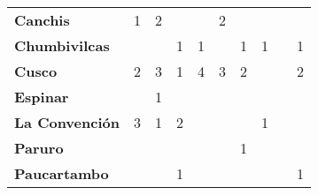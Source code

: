 \begin{tabular}{lccccccccc}
	\textbf{Canchis}                            
	&1  										&2                 			  &\cellcolor[HTML]{FCC46C}                   &\cellcolor[HTML]{FCC46C}                   &2         &\cellcolor[HTML]{FCC46C}                				  	 &\cellcolor[HTML]{FCC46C}                   &\cellcolor[HTML]{FCC46C} 		  &\cellcolor[HTML]{FCC46C} \\
	\textbf{Chumbivilcas}                      
	&\cellcolor[HTML]{FCC46C}                   &\cellcolor[HTML]{FCC46C}        &1                   &1                    						&\cellcolor[HTML]{FCC46C}                               &1                  						&1            								&\cellcolor[HTML]{FCC46C}   			    &1 \\
	\textbf{Cusco}                             
	&2 				     						&3                  			 &1                    				        &4                                          &3                    			 			&2                  
	&\cellcolor[HTML]{FCC46C}                   &\cellcolor[HTML]{FCC46C}    	 
	&2 					\\
	\textbf{Espinar}       					   
	&\cellcolor[HTML]{FCC46C}        			&1                						   
	&\cellcolor[HTML]{FCC46C}                   &\cellcolor[HTML]{FCC46C}        &\cellcolor[HTML]{FCC46C}                   &\cellcolor[HTML]{FCC46C}                   &\cellcolor[HTML]{FCC46C}  		            &\cellcolor[HTML]{FCC46C} 
	&\cellcolor[HTML]{FCC46C} \\
	\textbf{La Convención}                     
	&3 				 							&1                               &2                     					    &\cellcolor[HTML]{FCC46C}                   		&\cellcolor[HTML]{FCC46C}                   &\cellcolor[HTML]{FCC46C}                   &1              							&\cellcolor[HTML]{FCC46C} 								 &\cellcolor[HTML]{FCC46C}\\
	\textbf{Paruro}                            
	&\cellcolor[HTML]{FCC46C} 					&\cellcolor[HTML]{FCC46C}       	 &\cellcolor[HTML]{FCC46C}              	    &\cellcolor[HTML]{FCC46C}                   &\cellcolor[HTML]{FCC46C}              	    &1        
	&\cellcolor[HTML]{FCC46C}                   &\cellcolor[HTML]{FCC46C}   				
	&\cellcolor[HTML]{FCC46C} \\
	\textbf{Paucartambo}               		   
	&\cellcolor[HTML]{FCC46C}  				    &\cellcolor[HTML]{FCC46C}        &1                      
	&\cellcolor[HTML]{FCC46C}                   &\cellcolor[HTML]{FCC46C}       &\cellcolor[HTML]{FCC46C}                      
	&\cellcolor[HTML]{FCC46C}                   & \cellcolor[HTML]{FCC46C} 		 &1\\

\end{tabular}
